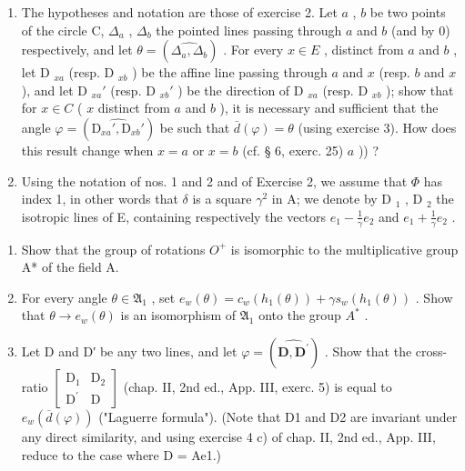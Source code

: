 \begin{enumerate}
\def\labelenumi{\arabic{enumi})}
\setcounter{enumi}{3}
\item
  The hypotheses and notation are those of exercise 2. Let \(a\) , \(b\) be two points of the circle C, \(\Delta_{a}\) , \(\Delta_{b}\) the pointed lines passing through \(a\) and \(b\) (and by 0) respectively, and let \(\theta = (\widehat{\Delta_{a}, \Delta_{b}})\) . For every \(x \in E\) , distinct from \(a\) and \(b\) , let D \(_{xa}\) (resp. D \(_{xb}\) ) be the affine line passing through \(a\) and \(x\) (resp. \(b\) and \(x\) ), and let D \(_{xa}'\) (resp. D \(_{xb}'\) ) be the direction of D \(_{xa}\) (resp. D \(_{xb}\) ); show that for \(x \in C\) ( \(x\) distinct from \(a\) and \(b\) ), it is necessary and sufficient that the angle \(\varphi = (\widehat{\mathrm{D}_{xa}', \mathrm{D}_{xb}'})\) be such that \(\bar{d}(\varphi) = \theta\) (using exercise 3). How does this result change when \(x = a\) or \(x = b\) (cf. § 6, exerc. 25) \(a\) )) ?
\item
  Using the notation of nos. 1 and 2 and of Exercise 2, we assume that \(\Phi\) has index 1, in other words that \(\delta\) is a square \(\gamma^{2}\) in A; we denote by D \(_{1}\) , D \(_{2}\) the isotropic lines of E, containing respectively the vectors \(e_{1}-\frac{1}{\gamma}e_{2}\) and \(e_{1}+\frac{1}{\gamma}e_{2}\) .
\end{enumerate}

\begin{enumerate}
\def\labelenumi{\alph{enumi})}
\item
  Show that the group of rotations \(O^{+}\) is isomorphic to the multiplicative group A* of the field A.
\item
  For every angle \(\theta \in \mathfrak{A}_1\) , set \(e_w(\theta) = c_w(h_1(\theta)) + \gamma s_w(h_1(\theta))\) . Show that \(\theta \to e_w(\theta)\) is an isomorphism of \(\mathfrak{A}_1\) onto the group \(A^*\) .
\item
  Let D and D′ be any two lines, and let \(\varphi = (\widehat{\mathbf{D},\mathbf{D}^{\prime}})\) . Show that the cross-ratio \(\left[ \begin{array}{cc}\mathrm{D}_{1} & \mathrm{D}_{2}\\ \mathrm{D}^{\prime} & \mathrm{D} \end{array} \right]\) (chap. II, 2nd ed., App. III, exerc. 5) is equal to \(e_w(\overline{d} (\varphi))\) ("Laguerre formula"). (Note that D1 and D2 are invariant under any direct similarity, and using exercise 4 c) of chap. II, 2nd ed., App. III, reduce to the case where D = Ae1.)
\end{enumerate}

